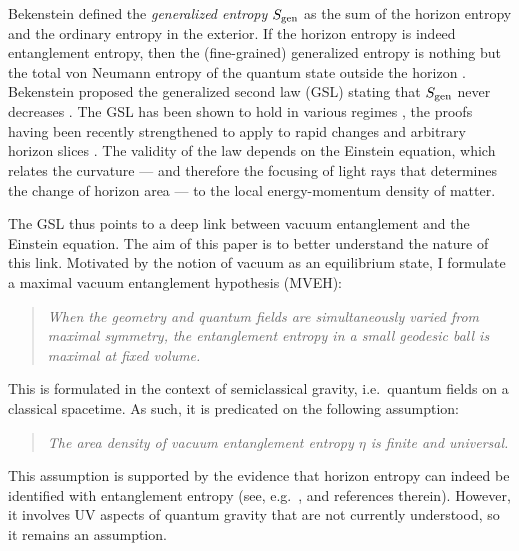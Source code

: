 \documentclass[aps,prd,showpacs,groupedaddress,nofootinbib,longbibliography,12pt]{revtex4-1}
\begin{document}
Bekenstein defined the {\it generalized entropy} $S_{\rm gen}$ 
as the sum of the horizon entropy and the ordinary entropy in the exterior.
If the horizon entropy is indeed entanglement entropy, then the (fine-grained) generalized entropy is nothing but the total von Neumann entropy of the quantum state outside the horizon \cite{Sorkin:1986mg,Sorkin:1997ja,Solodukhin:2011gn}. Bekenstein
proposed the generalized second law (GSL) stating that 
$S_{\rm gen}$ never decreases \cite{Bekenstein1973}. The GSL has been shown to hold in various regimes \cite{Wall10proofs}, the proofs having been recently strengthened to apply to rapid changes and arbitrary horizon slices \cite{Wall:2010cj,Wall:2011hj}. The validity of the law depends on the Einstein equation, which relates the curvature --- and therefore the focusing of light rays that determines the change of horizon area --- to the local energy-momentum density of matter. 

The GSL thus points to a deep link between vacuum entanglement and the Einstein equation. 
The aim of this paper is to better understand the nature of this link. Motivated by the notion of 
vacuum as an equilibrium state, I formulate a maximal vacuum entanglement hypothesis (MVEH):
%
\begin{quote}\it
When the geometry and quantum fields are simultaneously varied from maximal symmetry, 
the entanglement entropy in a small geodesic ball is maximal at fixed volume. 
\end{quote}
%
This is formulated in the context of semiclassical gravity, i.e.\ quantum fields on a classical spacetime.
As such, it is predicated on the following assumption:
%
\begin{quote}\it
The area density of vacuum entanglement entropy $\eta$ is finite and universal.
\end{quote}
%
This assumption is supported by the evidence that horizon entropy can indeed be identified with entanglement entropy (see, e.g.\ \cite{Solodukhin:2011gn,Jacobson:2012ek,Cooperman:2013iqr}, and references therein). 
However, it involves UV aspects of quantum gravity that are not currently understood, so it remains an assumption.
\end{document}
